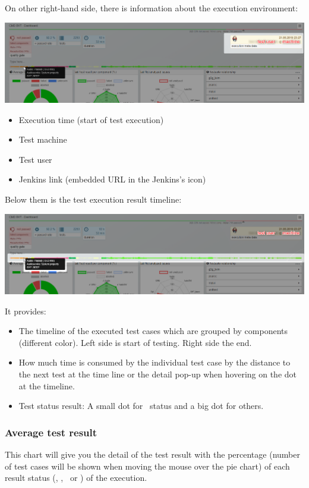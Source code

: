 On other right-hand side, there is information about the execution environment:

\includegraphics[width=1\linewidth]{./pictures/dashboard/result_environment.png}
\begin{itemize}
   \item Execution time (start of test execution)
   \item Test machine
   \item Test user
   \item Jenkins link (embedded URL in the Jenkins's icon)
\end{itemize}

Below them is the test execution result timeline:

\includegraphics[width=1\linewidth]{./pictures/dashboard/result_timeline.png}

It provides:
\begin{itemize}
   \item The timeline of the executed test cases which are grouped by components
         (different color). Left side is start of testing. Right side the end.
   \item How much time is consumed by the individual test case by the distance
         to the next test at the time line or the detail pop-up when hovering on the
         dot at the timeline.
   \item Test status result: A small dot for \passed\ status and a big dot
         for others.
\end{itemize}


\subsubsection{Average test result}
This chart will give you the detail of the test
result with the percentage (number of test cases will be shown when moving the mouse
over the pie chart) of each result status (\passed, \failed,
\unknown\ or \aborted) of the execution.

